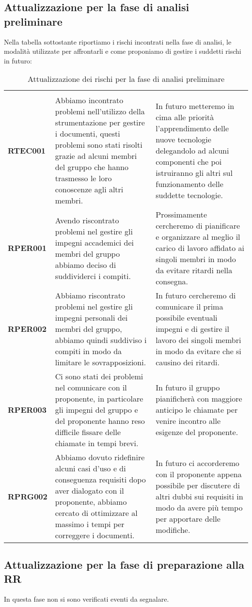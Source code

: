\documentclass[../piano-di-progetto]{subfiles}
\begin{document}
\subsection{Attualizzazione per la fase di analisi preliminare}%
\label{sub:attualizzazione_fase_analisi_preliminare}
Nella tabella sottostante riportiamo i rischi incontrati nella fase di analisi, le modalità utilizzate per affrontarli e come proponiamo di gestire i suddetti rischi in futuro:

\begin{longtable}[H]{|p{10em}|p{17em}|p{17em}|}
  \caption{Attualizzazione dei rischi per la fase di analisi preliminare}%
  \label{tab:attualizzazione_fase_analisi_preliminare} \\
  \rowcolor{darkgray!90!}
  \color{white}{\textbf{Rischio}} & \color{white}{\textbf{Gestione}} & \color{white}{\textbf{Monitoraggio}} \\
  \textbf{RTEC001} & Abbiamo incontrato problemi nell'utilizzo della strumentazione per gestire i documenti, questi problemi sono stati risolti grazie ad alcuni membri del gruppo che hanno trasmesso le loro conoscenze agli altri membri. & In futuro metteremo in cima alle priorità l'apprendimento delle nuove tecnologie delegandolo ad alcuni componenti che poi istruiranno gli altri sul funzionamento delle suddette tecnologie.\\
  \textbf{RPER001} & Avendo riscontrato problemi nel gestire gli impegni accademici dei membri del gruppo abbiamo deciso di suddividerci i compiti. & Prossimamente cercheremo di pianificare e organizzare al meglio il carico di lavoro affidato ai singoli membri in modo da evitare ritardi nella consegna.\\
  \textbf{RPER002} & Abbiamo riscontrato problemi nel gestire gli impegni personali dei membri del gruppo, abbiamo quindi suddiviso i compiti in modo da limitare le sovrapposizioni. & In futuro cercheremo di comunicare il prima possibile eventuali impegni e di gestire il lavoro dei singoli membri in modo da evitare che si causino dei ritardi.\\
  \textbf{RPER003} & Ci sono stati dei problemi nel comunicare con il proponente, in particolare gli impegni del gruppo e del proponente hanno reso difficile fissare delle chiamate in tempi brevi. & In futuro il gruppo pianificherà con maggiore anticipo le chiamate per venire incontro alle esigenze del proponente.\\
  \textbf{RPRG002} & Abbiamo dovuto ridefinire alcuni casi d'uso e di conseguenza requisiti dopo aver dialogato con il proponente, abbiamo cercato di ottimizzare al massimo i tempi per correggere i documenti. & In futuro ci accorderemo con il proponente appena possibile per discutere di altri dubbi sui requisiti in modo da avere più tempo per apportare delle modifiche.\\
\end{longtable}


\subsection{Attualizzazione per la fase di preparazione alla RR}%
\label{sub:attualizzazione_fase_prep_RR}
In questa fase non si sono verificati eventi da segnalare.
\end{document}

